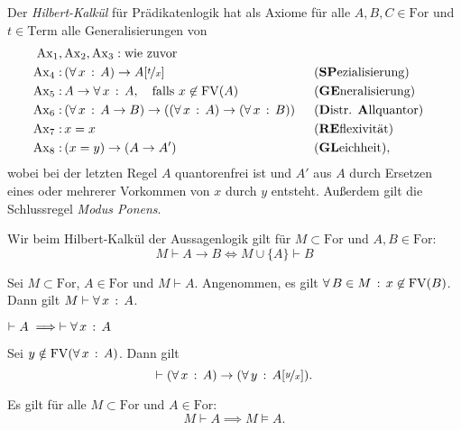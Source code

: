 \documentclass{cheat-sheet}
\newcommand{\Term}{\mathrm{Term}} %
\newcommand{\For}{\mathrm{For}} %
\newcommand{\Ax}{\mathrm{Ax}} %
\newcommand{\FV}{\mathrm{FV}} %
\newcommand{\subst}[2]{\nicefrac{#1}{#2}} %
\begin{document}
\begin{defn}
  Der \emph{Hilbert-Kalkül} für Prädikatenlogik hat als Axiome für alle $A, B, C \in \For$ und $t \in \Term$ alle Generalisierungen von
  \begin{alignat*}{3}
    \Ax_1,\,&\Ax_2,\Ax_3 : \text{wie zuvor}\\
    \Ax_4 :\, & (\fa{x} A) \to A[\subst{t}{x}] && \text{(\textbf{SP}ezialisierung)}\\
    \Ax_5 :\, & A \to \fa{x} A, \quad \text{falls $x \not\in \FV(A)$} && \text{(\textbf{GE}neralisierung)}\\
    \Ax_6 :\, & (\fa{x} A \to B) \to ((\fa{x} A) \to (\fa{x} B)) \enspace && \text{(\textbf{D}istr. \textbf{A}llquantor)}\\
    \Ax_7 :\, & x = x && \text{(\textbf{RE}flexivität)}\\
    \Ax_8 :\, & (x = y) \to (A \to A') && \text{(\textbf{GL}eichheit)},
  \end{alignat*}
  wobei bei der letzten Regel $A$ quantorenfrei ist und $A'$ aus $A$ durch Ersetzen eines oder mehrerer Vorkommen von $x$ durch $y$ entsteht. Außerdem gilt die Schlussregel \emph{Modus Ponens}.
\end{defn}


\begin{satz}[Deduktionstheorem]
  Wir beim Hilbert-Kalkül der Aussagenlogik gilt für $M \subset \For$ und $A, B \in \For$:
  \[ M \vdash A \to B \iff M \cup \{ A \} \vdash B \]
\end{satz}

\begin{satz}[Generalisierungstheorem]
  Sei $M \subset \For$, $A \in \For$ und $M \vdash A$. Angenommen, es gilt $\fa{B \in M} x \not\in \FV(B)$. Dann gilt $M \vdash \forall \, {x} \,:\, A$.
\end{satz}

\begin{kor}
  $\vdash A \implies \vdash \forall \, {x} \,:\, A$
\end{kor}

\begin{prop}
  Sei $y \notin \FV(\fa{x} A)$. Dann gilt
  \[ \vdash (\fa{x} A) \to (\fa{y} A[\subst{y}{x}]). \]
\end{prop}


\begin{satz}[Korrektheit]
  Es gilt für alle $M \subset \For$ und $A \in \For$:
  \[ M \vdash A \implies M \models A. \]
\end{satz}
\end{document}
